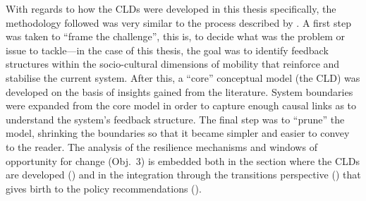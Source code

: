 
With regards to how the CLDs were developed in this thesis specifically, the methodology followed was very similar to the process described by \textcite{laurenti2015_TowardsAddressingUnintended}. A first step was taken to ``frame the challenge'', this is, to decide what was the problem or issue to tackle---in the case of this thesis, the goal was to identify feedback structures within the socio-cultural dimensions of mobility that reinforce and stabilise the current system. After this, a ``core'' conceptual model (the CLD) was developed on the basis of insights gained from the literature. System boundaries were expanded from the core model in order to capture enough causal links as to understand the system's feedback structure. The final step was to ``prune'' the model, shrinking the boundaries so that it became simpler and easier to convey to the reader. The analysis of the resilience mechanisms and windows of opportunity for change (Obj.~3) is embedded both in the section where the CLDs are developed () and in the integration through the transitions perspective () that gives birth to the policy recommendations ().
